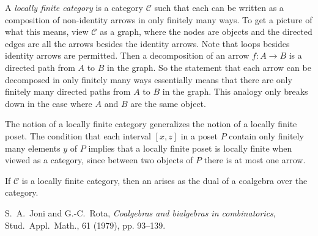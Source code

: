 \documentclass[12pt]{article}
\begin{document}

A \emph{locally finite category} is a category $\mathcal{C}$ such that each  can be written as a composition of non-identity arrows in only finitely many ways.  To get a picture of what this means, view $\mathcal{C}$ as a graph, where the nodes are objects and the directed edges are all the arrows besides the identity arrows.  Note that loops besides identity arrows are permitted.  Then a decomposition of an arrow $f\colon A\to B$ is a directed path from $A$ to $B$ in the graph.  So the statement that each arrow can be decomposed in only finitely many ways essentially means that there are only finitely many directed paths from $A$ to $B$ in the graph.  This analogy only breaks down in the case where $A$ and $B$ are the same object.

The notion of a locally finite category generalizes the notion of a locally finite poset.  The condition that each interval $[x,z]$ in a poset $P$ contain only finitely many elements $y$ of $P$ implies that a locally finite poset is locally finite when viewed as a category, since between two objects of $P$ there is at most one arrow.

If $\mathcal{C}$ is a locally finite category, then an  arises as the dual of a coalgebra over the category.

\begin{thebibliography}{99}
S.~A.~Joni and G.-C.~Rota, {\it Coalgebras and bialgebras in combinatorics}, Stud.~Appl.~Math., 61 (1979), pp. 93--139.
\end{thebibliography}
\end{document}
